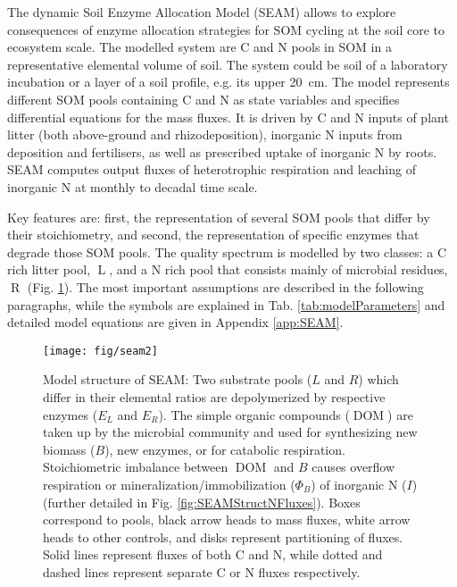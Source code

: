 The dynamic Soil Enzyme Allocation Model (SEAM) allows to explore consequences
of enzyme allocation strategies for SOM cycling at the soil core to ecosystem
scale. The modelled system are C and N pools in SOM in a representative
elemental volume of soil. The system could be soil of a laboratory incubation or
a layer of a soil profile, e.g. its upper 20~\unit{cm}.
The model represents different SOM pools containing C and N as state variables
and specifies differential equations for the mass fluxes. It is driven by C and
N inputs of plant litter (both above-ground and rhizodeposition), inorganic N
inputs from deposition and fertilisers, as well as prescribed
uptake of inorganic N by roots. SEAM computes output fluxes of heterotrophic
respiration and leaching of inorganic N at monthly to decadal time scale.

Key features are: first, the representation of several SOM pools that differ by
their stoichiometry, and second, the representation of
specific enzymes that degrade those SOM pools. The quality spectrum is modelled by two
classes: a C rich litter pool,
$\operatorname{L}$, and a N rich pool that consists
mainly of microbial residues, $\operatorname{R}$ (Fig. \ref{fig:SEAMStruct}). The most important assumptions are described in the following paragraphs, while
the symbols are explained in Tab. \ref{tab:modelParameters} and detailed model
equations are given in Appendix \ref{app:SEAM}. 

\begin{figure}[t] \vspace*{2mm}
\begin{center}
\texttt{[image: fig/seam2]}
\end{center}
\caption{
Model structure of SEAM: Two substrate pools ($L$ and $R$) which differ in their
elemental ratios are depolymerized by respective enzymes ($E_L$ and $E_R$). The
simple organic compounds ($\operatorname{DOM}$) are taken up by the microbial
community  and used for synthesizing new biomass (${B}$), new enzymes, or for
catabolic respiration. Stoichiometric imbalance between $\operatorname{DOM}$ and
${B}$ causes overflow respiration or mineralization/immobilization ($\Phi_B$) of
inorganic N ($I$) (further detailed in Fig.
\ref{fig:SEAMStructNFluxes}).
Boxes correspond to pools, black arrow heads to mass fluxes, white arrow heads to
other controls, and disks represent partitioning of fluxes. Solid lines
represent fluxes of both C and N, while dotted and dashed lines represent
separate C or N fluxes respectively.
\label{fig:SEAMStruct}
}
\end{figure}



